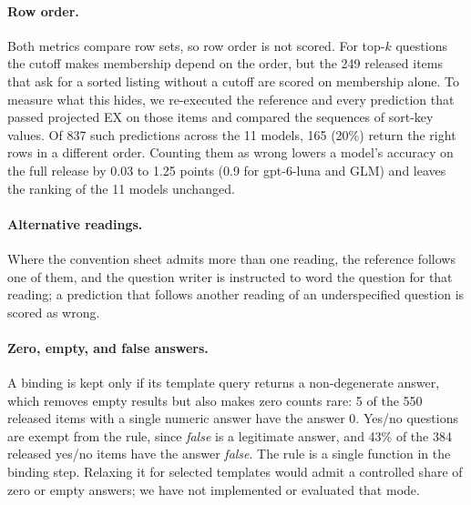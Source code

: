 \paragraph{Row order.} Both metrics compare row sets, so row order is not scored. For top-$k$ questions the cutoff makes membership depend on the order, but the 249 released items that ask for a sorted listing without a cutoff are scored on membership alone. To measure what this hides, we re-executed the reference and every prediction that passed projected EX on those items and compared the sequences of sort-key values. Of 837 such predictions across the 11 models, 165 (20\%) return the right rows in a different order. Counting them as wrong lowers a model's accuracy on the full release by 0.03 to 1.25 points (0.9 for gpt-6-luna and GLM) and leaves the ranking of the 11 models unchanged.

\paragraph{Alternative readings.} Where the convention sheet admits more than one reading, the reference follows one of them, and the question writer is instructed to word the question for that reading; a prediction that follows another reading of an underspecified question is scored as wrong.

\paragraph{Zero, empty, and false answers.} A binding is kept only if its template query returns a non-degenerate answer, which removes empty results but also makes zero counts rare: 5 of the 550 released items with a single numeric answer have the answer 0. Yes/no questions are exempt from the rule, since \emph{false} is a legitimate answer, and 43\% of the 384 released yes/no items have the answer \emph{false}. The rule is a single function in the binding step. Relaxing it for selected templates would admit a controlled share of zero or empty answers; we have not implemented or evaluated that mode.
